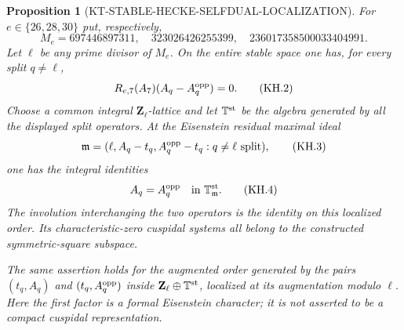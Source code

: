 \documentclass[11pt,a4paper]{article}
\newtheorem{proposition}[theorem]{Proposition}
\theoremstyle{definition}
\begin{document}
\begin{proposition}[KT-STABLE-HECKE-SELFDUAL-LOCALIZATION]
For $e\in\{26,28,30\}$ put, respectively,
\[
 M_e=697446897311,\quad323026426255399,\quad
      236017358500033404991.
                                                               \tag{KH.1}
\]
Let $\ell$ be any prime divisor of $M_e$.  On the entire stable
space one has, for every split $q\ne\ell$,
\[
 R_{e,7}(A_7)(A_q-A_q^{\rm opp})=0.                         \tag{KH.2}
\]
Choose a common integral $\mathbf Z_\ell$-lattice and let
$\mathbb T^{\rm st}$ be the algebra generated by all the displayed
split operators.  At the Eisenstein residual maximal ideal
\[
 \mathfrak m=(\ell,A_q-t_q,A_q^{\rm opp}-t_q:q\ne\ell
                   \text{ split}),                        \tag{KH.3}
\]
one has the integral identities
\[
         A_q=A_q^{\rm opp}\quad\hbox{in }
                       \mathbb T^{\rm st}_{\mathfrak m}.  \tag{KH.4}
\]
The involution interchanging the two operators is the identity
on this localized order.  Its characteristic-zero cuspidal
systems all belong to the constructed symmetric-square subspace.

The same assertion holds for the augmented order generated by
the pairs $(t_q,A_q)$ and $(t_q,A_q^{\rm opp})$ inside
$\mathbf Z_\ell\oplus\mathbb T^{\rm st}$, localized at its
augmentation modulo $\ell$.  Here the first factor is a formal
Eisenstein character; it is not asserted to be a compact
cuspidal representation.
\end{proposition}
\end{document}
